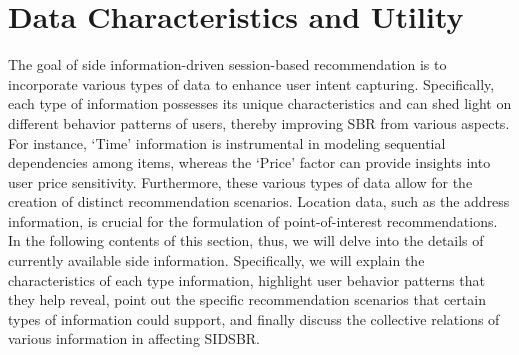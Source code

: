 \documentclass[lettersize,journal]{IEEEtran}
\newcommand{\baby}{{SIDSBR}\xspace}
\begin{document}






\section{Data Characteristics and Utility}\label{dataUti}
The goal of side information-driven session-based recommendation is to incorporate various types of data to enhance user intent capturing. Specifically, each type of information possesses its unique characteristics and can shed light on different behavior patterns of users, thereby improving SBR from various aspects. For instance, `Time' information is instrumental in modeling sequential dependencies among items, whereas the `Price' factor can provide insights into user price sensitivity. Furthermore, these various types of data allow for the creation of distinct recommendation scenarios. Location data, such as the address information, is crucial for the formulation of point-of-interest recommendations. In the following contents of this section, thus, we will delve into the details of currently available side information. Specifically, we will explain the characteristics of each type information, highlight user behavior patterns that they help reveal, point out the specific recommendation scenarios that certain types of information could support, and finally discuss the collective relations of various information in affecting \baby. 
\end{document}
